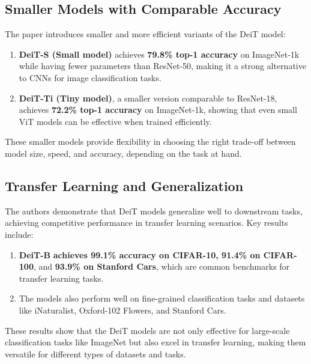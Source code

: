 \documentclass{report}
\begin{document}
	
	
	
	\subsection{Smaller Models with Comparable Accuracy}
	The paper introduces smaller and more efficient variants of the DeiT model:
	
	\begin{enumerate}
		\item 
		\textbf{DeiT-S (Small model)} achieves \textbf{79.8\% top-1 accuracy} on ImageNet-1k while having fewer parameters than ResNet-50, making it a strong alternative to CNNs for image classification tasks.
		
		\item 
		\textbf{DeiT-Ti (Tiny model)}, a smaller version comparable to ResNet-18, achieves \textbf{72.2\% top-1 accuracy} on ImageNet-1k, showing that even small ViT models can be effective when trained efficiently.
	\end{enumerate}
	
	These smaller models provide flexibility in choosing the right trade-off between model size, speed, and accuracy, depending on the task at hand.
	
	
	
	
	\subsection{Transfer Learning and Generalization}
	The authors demonstrate that DeiT models generalize well to downstream tasks, achieving competitive performance in transfer learning scenarios. Key results include:
	
	\begin{enumerate}
		\item 
		\textbf{DeiT-B} \textbf{achieves 99.1\% accuracy on CIFAR-10, 91.4\% on CIFAR-100}, and \textbf{93.9\% on Stanford Cars}, which are common benchmarks for transfer learning tasks.
		
		\item 
		The models also perform well on fine-grained classification tasks and datasets like iNaturalist, Oxford-102 Flowers, and Stanford Cars.
	\end{enumerate}These results show that the DeiT models are not only effective for large-scale classification tasks like ImageNet but also excel in transfer learning, making them versatile for different types of datasets and tasks.
	
	
	
\end{document}
